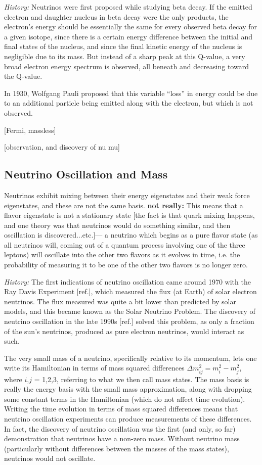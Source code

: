 {\color{gray}\emph{History:  }Neutrinos were first proposed while studying beta decay.  If the emitted electron and daughter nucleus in beta decay were the only products, the electron's energy should be essentially the same for every observed beta decay for a given isotope, since there is a certain energy difference between the initial and final states of the nucleus, and since the final kinetic energy of the nucleus is negligible due to its mass.  But instead of a sharp peak at this Q-value, a very broad electron energy spectrum is observed, all beneath and decreasing toward the Q-value.

In 1930, Wolfgang Pauli proposed that this variable ``loss'' in energy could be due to an additional particle being emitted along with the electron, but which is not observed.

[Fermi, massless]

[observation, and discovery of nu mu]}

\subsection{Neutrino Oscillation and Mass}

{\color{red}Neutrinos exhibit mixing between their energy eigenstates and their weak force eigenstates, and these are not the same basis. }  {\color{red}\textbf{not really:}  This means that a flavor eigenstate is not a stationary state} [the fact is that quark mixing happens, and one theory was that neutrinos would do something similar, and then oscillation is discovered...etc.]--- a neutrino which begins as a pure flavor state (as all neutrinos will, coming out of a quantum process involving one of the three leptons) will oscillate into the other two flavors as it evolves in time, i.e. the probability of measuring it to be one of the other two flavors is no longer zero.

{\color{gray}\emph{History:  }The first indications of neutrino oscillation came around 1970 with the Ray Davis Experiment [ref.], which measured the flux (at Earth) of solar electron neutrinos.  The flux measured was quite a bit lower than predicted by solar models, and this became known as the Solar Neutrino Problem.  The discovery of neutrino oscillation in the late 1990s [ref.] solved this problem, as only a fraction of the sun's neutrinos, produced as pure electron neutrinos, would interact as such.}

The very small mass of a neutrino, specifically relative to its momentum, lets one write its Hamiltonian in terms of mass squared differences $\Delta m_{ij}^{2} = m_{i}^{2} - m_{j}^{2}$, where $i$,$j$ = 1,2,3, referring to what we then call mass states.  The mass basis is really the energy basis with the small mass approximation, along with dropping some constant terms in the Hamiltonian (which do not affect time evolution).  Writing the time evolution in terms of mass squared differences means that neutrino oscillation experiments can produce measurements of these differences.  In fact, the discovery of neutrino oscillation was the first (and only, so far) demonstration that neutrinos have a non-zero mass.  Without neutrino mass (particularly without differences between the masses of the mass states), neutrinos would not oscillate.

